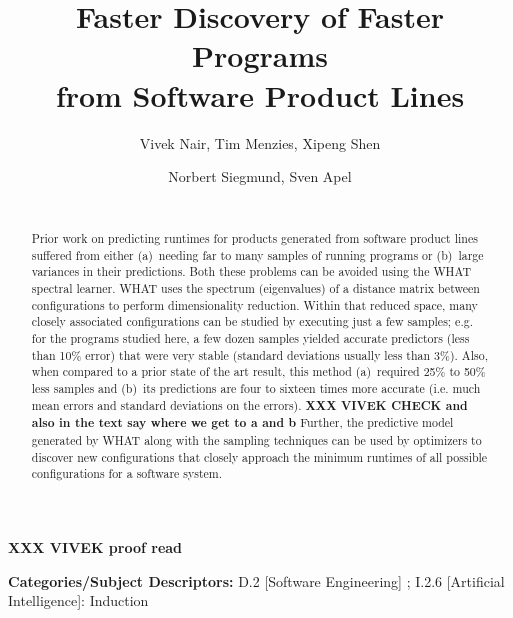 \documentclass{sig-alternative}
\begin{document}
\title{Faster Discovery  of Faster Programs \\from Software Product Lines} 
\author{
        \alignauthor Vivek Nair, Tim Menzies, Xipeng Shen 
    \and  
        \alignauthor Norbert Siegmund, Sven Apel \\
        \\
       }

\maketitle 
\thispagestyle{plain}
\pagestyle{plain}
{\bf XXX VIVEK proof read} 
\begin{abstract}
Prior work on predicting runtimes for products generated from
software product lines suffered from either (a)~needing far to many samples
of running programs or (b)~large variances in their predictions.
Both these problems can be avoided using the WHAT
spectral learner. 
WHAT  uses the spectrum (eigenvalues) of a distance matrix
between configurations to perform dimensionality reduction. Within that
reduced space, many closely associated configurations can be studied
by executing just a few samples; e.g. for the programs studied
here, a few dozen samples yielded accurate predictors (less than 10\% error)
that were very stable (standard deviations usually less than 3\%).  
Also, when compared to a prior state of the art result, this method (a)~required  
25\% to 50\% less samples 
and (b)~its predictions are   four to sixteen times more accurate (i.e. much mean errors
and 
standard deviations on the errors). 
{\bf XXX VIVEK CHECK and also in  the text say where we get to a and b}  
Further, the predictive model generated by
WHAT along with the sampling techniques can be used by optimizers to discover new configurations that closely
approach the minimum runtimes of all possible configurations for a software system.
\end{abstract}

\vspace{1mm}
\noindent
{\bf Categories/Subject Descriptors:} 
D.2 [Software Engineering] ;
I.2.6 [Artificial Intelligence]: Induction

 
\vspace{1mm}
\noindent
\end{document}

